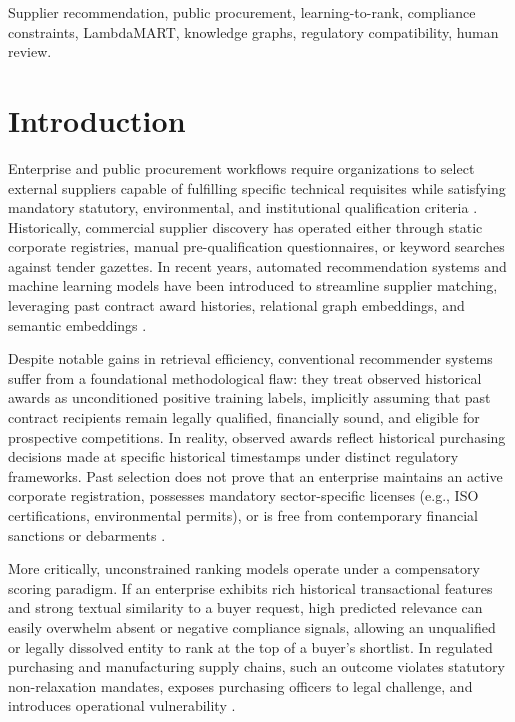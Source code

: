 \documentclass[journal,10pt,onecolumn,draftclsnofoot]{IEEEtran}
\begin{document}
\begin{IEEEkeywords}
Supplier recommendation, public procurement, learning-to-rank, compliance constraints, LambdaMART, knowledge graphs, regulatory compatibility, human review.
\end{IEEEkeywords}

\section{Introduction}
Enterprise and public procurement workflows require organizations to select external suppliers capable of fulfilling specific technical requisites while satisfying mandatory statutory, environmental, and institutional qualification criteria \cite{mokhtari2026tenderkg, munozpla2026decade}. Historically, commercial supplier discovery has operated either through static corporate registries, manual pre-qualification questionnaires, or keyword searches against tender gazettes. In recent years, automated recommendation systems and machine learning models have been introduced to streamline supplier matching, leveraging past contract award histories, relational graph embeddings, and semantic embeddings \cite{li2026knochain, wu2025generalizable, tu2024using}.

Despite notable gains in retrieval efficiency, conventional recommender systems suffer from a foundational methodological flaw: they treat observed historical awards as unconditioned positive training labels, implicitly assuming that past contract recipients remain legally qualified, financially sound, and eligible for prospective competitions. In reality, observed awards reflect historical purchasing decisions made at specific historical timestamps under distinct regulatory frameworks. Past selection does not prove that an enterprise maintains an active corporate registration, possesses mandatory sector-specific licenses (e.g., ISO certifications, environmental permits), or is free from contemporary financial sanctions or debarments \cite{kim2024accuracy, nai2023public}.

More critically, unconstrained ranking models operate under a compensatory scoring paradigm. If an enterprise exhibits rich historical transactional features and strong textual similarity to a buyer request, high predicted relevance can easily overwhelm absent or negative compliance signals, allowing an unqualified or legally dissolved entity to rank at the top of a buyer's shortlist. In regulated purchasing and manufacturing supply chains, such an outcome violates statutory non-relaxation mandates, exposes purchasing officers to legal challenge, and introduces operational vulnerability \cite{siciliani2023ai, khan2023resilient}.
\end{document}
